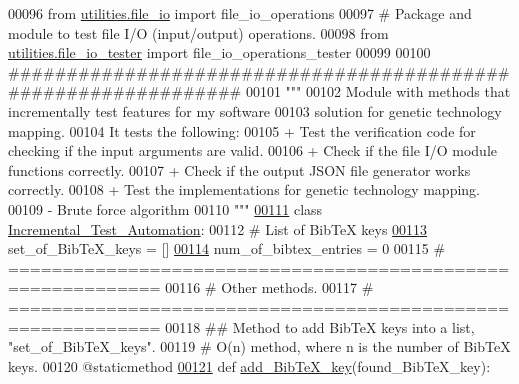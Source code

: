 \begin{DoxyCode}
00096 \textcolor{keyword}{from} \hyperlink{namespaceutilities_1_1file__io}{utilities.file\_io} \textcolor{keyword}{import} file\_io\_operations
00097 \textcolor{comment}{# Package and module to test file I/O (input/output) operations.}
00098 \textcolor{keyword}{from} \hyperlink{namespaceutilities_1_1file__io__tester}{utilities.file\_io\_tester} \textcolor{keyword}{import} file\_io\_operations\_tester
00099 
00100 \textcolor{comment}{###############################################################}
00101 \textcolor{stringliteral}{"""}
00102 \textcolor{stringliteral}{    Module with methods that incrementally test features for my software}
00103 \textcolor{stringliteral}{        solution for genetic technology mapping.}
00104 \textcolor{stringliteral}{    It tests the following:}
00105 \textcolor{stringliteral}{    + Test the verification code for checking if the input arguments are valid.}
00106 \textcolor{stringliteral}{    + Check if the file I/O module functions correctly.}
00107 \textcolor{stringliteral}{    + Check if the output JSON file generator works correctly.}
00108 \textcolor{stringliteral}{    + Test the implementations for genetic technology mapping.}
00109 \textcolor{stringliteral}{        - Brute force algorithm}
00110 \textcolor{stringliteral}{"""}
\hypertarget{incremental__test_8py_source_l00111}{}\hyperlink{classincremental__test_1_1Incremental__Test__Automation}{00111} \textcolor{keyword}{class }\hyperlink{classincremental__test_1_1Incremental__Test__Automation}{Incremental\_Test\_Automation}:
00112     \textcolor{comment}{# List of BibTeX keys}
\hypertarget{incremental__test_8py_source_l00113}{}\hyperlink{classincremental__test_1_1Incremental__Test__Automation_a8f5272e0488026aa24a829262392f2f7}{00113}     set\_of\_BibTeX\_keys = []
\hypertarget{incremental__test_8py_source_l00114}{}\hyperlink{classincremental__test_1_1Incremental__Test__Automation_ac60587acca9d28d055bd8a7198a987a1}{00114}     num\_of\_bibtex\_entries = 0
00115     \textcolor{comment}{# ============================================================}
00116     \textcolor{comment}{#   Other methods.}
00117     \textcolor{comment}{# ============================================================}
00118     \textcolor{comment}{##  Method to add BibTeX keys into a list, "set\_of\_BibTeX\_keys".}
00119     \textcolor{comment}{#   O(n) method, where n is the number of BibTeX keys.}
00120     @staticmethod
\hypertarget{incremental__test_8py_source_l00121}{}\hyperlink{classincremental__test_1_1Incremental__Test__Automation_a14b316790ae1ef50d84bd4741a4fa020}{00121}     \textcolor{keyword}{def }\hyperlink{classincremental__test_1_1Incremental__Test__Automation_a14b316790ae1ef50d84bd4741a4fa020}{add\_BibTeX\_key}(found\_BibTeX\_key):

\end{DoxyCode}
